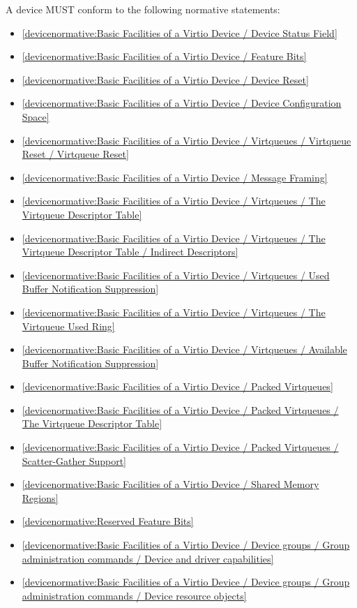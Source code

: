 \label{sec:Conformance / Device Conformance}

A device MUST conform to the following normative statements:

\begin{itemize}
\item \ref{devicenormative:Basic Facilities of a Virtio Device / Device Status Field}
\item \ref{devicenormative:Basic Facilities of a Virtio Device / Feature Bits}
\item \ref{devicenormative:Basic Facilities of a Virtio Device / Device Reset}
\item \ref{devicenormative:Basic Facilities of a Virtio Device / Device Configuration Space}
\item \ref{devicenormative:Basic Facilities of a Virtio Device / Virtqueues / Virtqueue Reset / Virtqueue Reset}
\item \ref{devicenormative:Basic Facilities of a Virtio Device / Message Framing}
\item \ref{devicenormative:Basic Facilities of a Virtio Device / Virtqueues / The Virtqueue Descriptor Table}
\item \ref{devicenormative:Basic Facilities of a Virtio Device / Virtqueues / The Virtqueue Descriptor Table / Indirect Descriptors}
\item \ref{devicenormative:Basic Facilities of a Virtio Device / Virtqueues / Used Buffer Notification Suppression}
\item \ref{devicenormative:Basic Facilities of a Virtio Device / Virtqueues / The Virtqueue Used Ring}
\item \ref{devicenormative:Basic Facilities of a Virtio Device / Virtqueues / Available Buffer Notification Suppression}
\item \ref{devicenormative:Basic Facilities of a Virtio Device / Packed Virtqueues}
\item \ref{devicenormative:Basic Facilities of a Virtio Device / Packed Virtqueues / The Virtqueue Descriptor Table}
\item \ref{devicenormative:Basic Facilities of a Virtio Device / Packed Virtqueues / Scatter-Gather Support}
\item \ref{devicenormative:Basic Facilities of a Virtio Device / Shared Memory Regions}
\item \ref{devicenormative:Reserved Feature Bits}
\item \ref{devicenormative:Basic Facilities of a Virtio Device / Device groups / Group administration commands / Device and driver capabilities}
\item \ref{devicenormative:Basic Facilities of a Virtio Device / Device groups / Group administration commands / Device resource objects}
\end{itemize}

